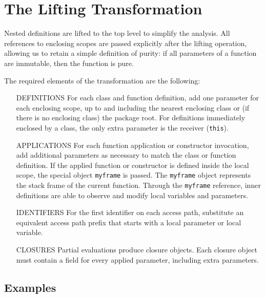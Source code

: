 \documentclass[letterpaper,11pt]{article}
\newcommand{\code}[1]{\lstinline$#1$}
\begin{document}
\section{The Lifting Transformation}

\label{framedef_examples}

Nested definitions are lifted to the top level to simplify the analysis.
All references to enclosing scopes are passed explicitly after the lifting operation,
allowing us to retain a simple definition of purity: if all parameters of
a function are immutable, then the function is pure.

The required elements of the transformation are the following:

\begin{itemize}
	
	\item [\mbox{\small DEFINITIONS}] For each class and function definition, add one parameter for each enclosing scope,
		up to and including the nearest enclosing class or (if there is no enclosing class) the package root.
		For definitions immediately enclosed by a class, the only extra parameter is the receiver (\code{this}).
		
	\item [\mbox{\small APPLICATIONS}] For each function application or constructor invocation,
		add additional parameters as necessary
		to match the class or function definition.
		If the applied function or constructor is defined inside the local scope, the special object \code{myframe}
		is passed. The \code{myframe} object represents the stack frame of the current function.
		Through the \code{myframe} reference, inner definitions are able to observe and modify
		local variables and parameters.
		
	\item [\mbox{\small IDENTIFIERS}] For the first identifier on each access path, substitute an equivalent
		access path prefix that starts with a local parameter or local variable.
	
	\item [\mbox{\small CLOSURES}] Partial evaluations produce closure objects. Each closure object must contain
		a field for every applied parameter, including extra parameters.
	
\end{itemize}

\subsection{Examples}
\end{document}
